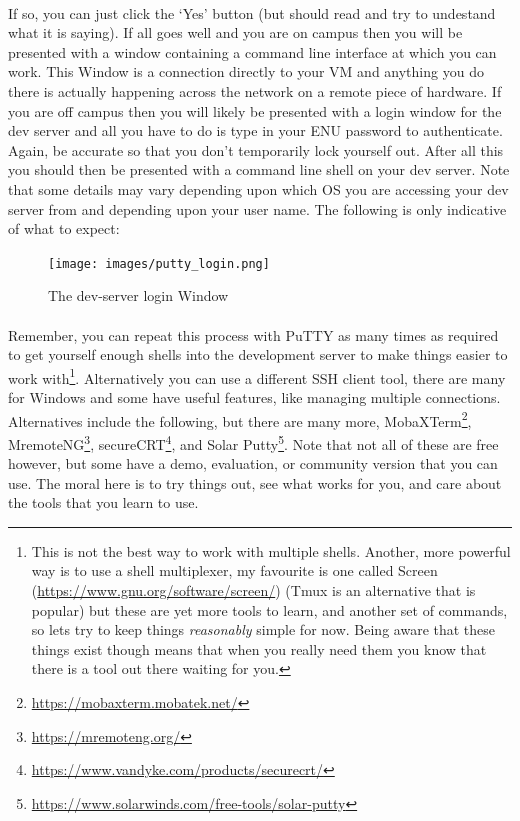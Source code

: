 \documentclass[12pt, a4paper, oneside]{book}
\begin{document}
\paragraph{} If so, you can just click the `Yes' button (but should read and try to undestand what it is saying). If all goes well and you are on campus then you will be presented with a window containing a command line interface at which you can work. This Window is a connection directly to your VM and anything you do there is actually happening across the network on a remote piece of hardware. If you are off campus then you will likely be presented with a login window for the dev server and all you have to do is type in your ENU password to authenticate. Again, be accurate so that you don't temporarily lock yourself out. After all this you should then be presented with a command line shell on your dev server. Note that some details may vary depending upon which OS you are accessing your dev server from and depending upon your user name. The following is only indicative of what to expect:

\begin{figure}[H]
\centering
\texttt{[image: images/putty\_login.png]}
\caption{The dev-server login Window}
\label{fig:dev-server-login-window}
\end{figure}

\paragraph{} Remember, you can repeat this process with PuTTY as many times as required to get yourself enough shells into the development server to make things easier to work with\footnote{This is not the best way to work with multiple shells. Another, more powerful way is to use a shell multiplexer, my favourite is one called Screen (\url{https://www.gnu.org/software/screen/}) (Tmux is an alternative that is popular) but these are yet more tools to learn, and another set of commands, so lets try to keep things \emph{reasonably} simple for now. Being aware that these things exist though means that when you really need them you know that there is a tool out there waiting for you.}. Alternatively you can use a different SSH client tool, there are many for Windows and some have useful features, like managing multiple connections. Alternatives include the following, but there are many more, MobaXTerm\footnote{\url{https://mobaxterm.mobatek.net/}}, MremoteNG\footnote{\url{https://mremoteng.org/}}, secureCRT\footnote{\url{https://www.vandyke.com/products/securecrt/}}, and Solar Putty\footnote{\url{https://www.solarwinds.com/free-tools/solar-putty}}. Note that not all of these are free however, but some have a demo, evaluation, or community version that you can use. The moral here is to try things out, see what works for you, and care about the tools that you learn to use.
\end{document}
